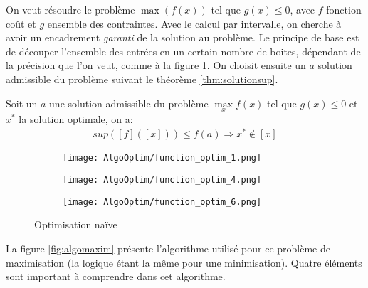 On veut résoudre le problème $\max(f(x))$ tel que $g(x) \leq 0$, avec $f$ fonction coût et $g$ ensemble des contraintes. Avec le calcul par intervalle, on cherche à avoir un encadrement \textit{garanti} de la solution au problème. Le principe de base est de découper l'ensemble des entrées en un certain nombre de boites, dépendant de la précision que l'on veut, comme à la figure \ref{fig:optim1}. On choisit ensuite un $a$ solution admissible du problème suivant le théorème \ref{thm:solutionsup}.

\begin{theoreme}
  \label{thm:solutionsup}
  Soit un $a$ une solution admissible du problème $\max\limits_{x} f(x)$ tel que $g(x) \leq 0$ et $x^*$ la solution optimale, on a:
  \begin{align}
      sup([f]([x])) \leq f(a) \Rightarrow x^* \notin [x]
  \end{align}
\end{theoreme}

\begin{figure}[H]
  \centering
  \begin{subfigure}[h]{0.3\textwidth}
      \centering
      \texttt{[image: AlgoOptim/function\_optim\_1.png]}
      \caption{}
      \label{fig:optim1}
  \end{subfigure}
  \begin{subfigure}[h]{0.3\textwidth}
      \centering
      \texttt{[image: AlgoOptim/function\_optim\_4.png]}
      \caption{}
      \label{fig:optim2}
  \end{subfigure}
  \begin{subfigure}[h]{0.3\textwidth}
      \centering
      \texttt{[image: AlgoOptim/function\_optim\_6.png]}
      \caption{}
      \label{fig:optim3}
  \end{subfigure}
  \caption{Optimisation naïve}
\end{figure}


La figure \ref{fig:algomaxim} présente l'algorithme utilisé pour ce problème de maximisation (la logique étant la même pour une minimisation). Quatre éléments sont important à comprendre dans cet algorithme.

